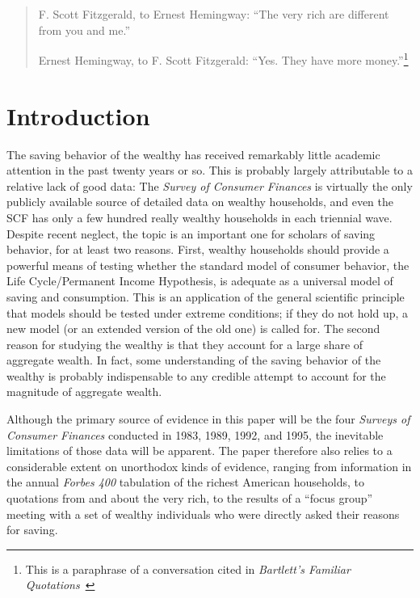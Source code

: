 \documentclass[titlepage,12pt]{article}
\begin{document}
\baselineskip 22pt
\vspace{0.5in}

\begin{quote}
\noindent F. Scott Fitzgerald, to Ernest Hemingway: \newline
\indent	{~~~~}``The very rich are different from you and me.''
	

\noindent Ernest Hemingway, to F. Scott Fitzgerald: \newline \indent 
\indent {~~~~}``Yes.  They have more money.''\footnote{This is a paraphrase of a 
conversation cited in {\it Bartlett's Familiar 
  Quotations}~\citeyear{bartlett:quotes}}
\end{quote}

\hypertarget{introduction}{}
\section{Introduction}

The saving behavior of the wealthy has received remarkably little 
academic attention in the past twenty years or so.  This is probably 
largely attributable to a relative lack of good data: The {\it Survey 
of Consumer Finances} is virtually the only publicly available source 
of detailed data on wealthy households, and even the SCF has only a 
few hundred really wealthy households in each triennial wave.  Despite 
recent neglect, the topic is an important one for scholars of saving 
behavior, for at least two reasons.  First, wealthy households should 
provide a powerful means of testing whether the standard model of 
consumer behavior, the Life Cycle/Permanent Income Hypothesis, is 
adequate as a universal model of saving and consumption.  This is an 
application of the general scientific principle that models should be 
tested under extreme conditions; if they do not hold up, a new model 
(or an extended version of the old one) is called for.  The second 
reason for studying the wealthy is that they account for a large share 
of aggregate wealth.  In fact, some understanding of the saving 
behavior of the wealthy is probably indispensable to any credible 
attempt to account for the magnitude of aggregate wealth.

Although the primary source of evidence in this paper will be the four 
{\it Surveys of Consumer Finances} conducted in 1983, 1989, 1992, and 
1995, the inevitable limitations of those data will be apparent.  The 
paper therefore also relies to a considerable extent on unorthodox 
kinds of evidence, ranging from information in the annual {\it Forbes 
400} tabulation of the richest American households, to quotations from and 
about the very rich, to the results of a ``focus group'' meeting with 
a set of wealthy individuals who were directly asked their reasons for 
saving.
\end{document}

